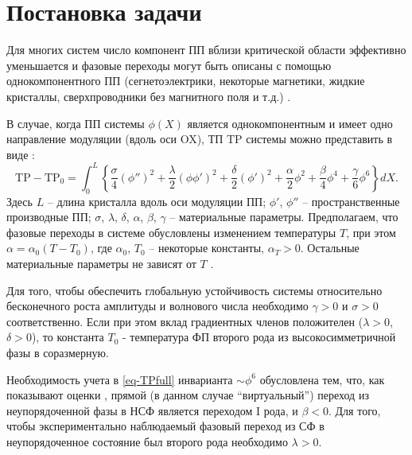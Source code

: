 
\chapter{Постановка задачи}\label{ch-task}

Для многих систем число компонент ПП вблизи критической области эффективно уменьшается и фазовые переходы могут быть описаны с помощью однокомпонентного ПП (сегнетоэлектрики, некоторые магнетики, жидкие кристаллы, сверхпроводники без магнитного поля и т.д.) \cite{Toledano1994, Izjumov1987, Buzdin1986}.

В случае, когда ПП системы $\phi(X)$ является однокомпонентным и имеет одно направление модуляции (вдоль оси OX), ТП $\mathrm{TP}$ системы  можно представить в виде \cite{Vysochanskii1994, Vysochanskii1990, Ema1990}:
\begin{equation}
\mathrm{TP} - \mathrm{TP}_0 = 
 	                      \int^L_0 \left\{\frac{\sigma}{4} \left( \phi'' \right)^2 + 
 	                      \frac{\lambda}{2}\left(\phi\phi'\right)^2 + 
 	                      \frac{\delta}{2}\left(\phi'\right)^2 +
 	                      \frac{\alpha}{2}\phi^2 + \frac{\beta}{4}\phi^4 + 
 	                      \frac{\gamma}{6}\phi^6
 	                      \right\} dX.
\label{eq-TPfull}
\end{equation}
Здесь  $L$ -- длина кристалла вдоль оси модуляции ПП;  $\phi'$, $\phi''$ -- пространственные производные ПП; $\sigma$, $\lambda$, $\delta$, $\alpha$, $\beta$, $\gamma$ -- материальные параметры.
Предполагаем, что фазовые переходы в системе обусловлены изменением температуры $T$, при этом $\alpha = \alpha_0(T-T_0)$, где $\alpha_0$, $T_0$ -- некоторые константы, $\alpha_T > 0$.
Остальные материальные параметры не зависят от $T$ \cite{Vysochanskii1994}.

Для того, чтобы обеспечить глобальную устойчивость системы относительно бесконечного роста амплитуды и волнового числа необходимо $\gamma > 0$ и $\sigma > 0$ соответственно.
Если при этом вклад градиентных членов положителен ($\lambda >0$, $\delta > 0$), то константа $T_0$ - температура ФП второго рода из высокосимметричной фазы в соразмерную.

Необходимость учета в \eqref{eq-TPfull} инварианта $\sim\phi^6$ обусловлена тем, что, как показывают оценки \cite{Vysochanskii1994}, прямой (в данном случае ``виртуальный'') переход из неупорядоченной фазы в НСФ является переходом I рода, и $\beta < 0$.
Для того, чтобы экспериментально наблюдаемый фазовый переход из СФ в неупорядоченное состояние  был второго рода необходимо $\lambda > 0$.

